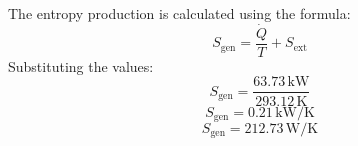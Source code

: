The entropy production is calculated using the formula:  
\[
S_{\text{gen}} = \frac{\dot{Q}}{T} + S_{\text{ext}}
\]  
Substituting the values:  
\[
S_{\text{gen}} = \frac{63.73 \, \text{kW}}{293.12 \, \text{K}}
\]  
\[
S_{\text{gen}} = 0.21 \, \text{kW/K}
\]  
\[
S_{\text{gen}} = 212.73 \, \text{W/K}
\]